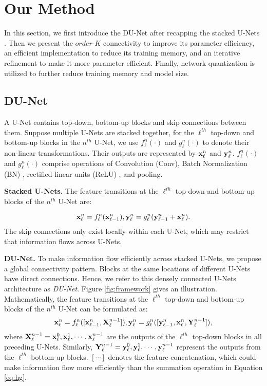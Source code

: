 \documentclass[runningheads]{llncs}
\begin{document}
%
 \section{Our Method}
In this section, we first introduce the DU-Net after recapping the stacked U-Nets \cite{newell2016stacked}. Then we present the $order$-$K$ connectivity to improve its parameter efficiency, an efficient implementation to reduce its training memory,
and an iterative refinement to make it more parameter efficient.
Finally, network quantization is utilized to further reduce training memory and model size.
\subsection{DU-Net}
A U-Net contains top-down, bottom-up blocks and skip connections between them. Suppose multiple U-Nets are stacked together, for the $\ell^{th}$ top-down and bottom-up blocks in the $n^{th}$ U-Net, we use $f_\ell^n(\cdot)$ and $g_\ell^n(\cdot)$ to denote their non-linear transformations. Their outputs are represented by ${\bf x}_\ell^n$ and ${\bf y}_\ell^n$. $f_\ell^n(\cdot)$ and $g_\ell^n(\cdot)$ comprise operations of Convolution (Conv), Batch Normalization (BN) \cite{ioffe2015batch}, rectified linear units (ReLU) \cite{glorot2011deep}, and pooling.


{\bf Stacked U-Nets.} The feature transitions at the $\ell^{th}$ top-down and bottom-up blocks of the $n^{th}$ U-Net are:

\begin{equation}\label{eq:hg}
    {\bf x}_\ell^n = f_\ell^n({\bf x}_{\ell-1}^n), {\bf y}_\ell^n = g_\ell^n({\bf y}_{\ell-1}^n+{\bf x}_\ell^n).
\end{equation}
The skip connections only exist locally within each U-Net, which may restrict that information flows across U-Nets.


{\bf DU-Net.} To make information flow efficiently across stacked U-Nets, we propose a global connectivity pattern. Blocks at the same locations of different U-Nets have direct connections. Hence, we refer to this densely connected U-Nets architecture as {\it DU-Net}. Figure \ref{fig:framework} gives an illustration. Mathematically, the feature transitions at the $\ell^{th}$ top-down and bottom-up blocks of the $n^{th}$ U-Net can be formulated as:
\begin{equation}\label{eq:dense-inputs}
    {\bf x}_\ell^n = f_\ell^n([{\bf x}_{\ell-1}^n, {\bf X}_\ell^{n-1}]), {\bf y}_\ell^n = g_\ell^n([{\bf y}_{\ell-1}^n,{\bf x}_\ell^n,{\bf Y}_\ell^{n-1}]),
\end{equation}
where ${\bf X}_\ell^{n-1}={\bf x}_\ell^0,{\bf x}_\ell^1,\cdots,{\bf x}_\ell^{n-1}$ are the outputs of the $\ell^{th}$ top-down blocks in all preceding U-Nets. Similarly, ${\bf Y}_\ell^{n-1}={\bf y}_\ell^0,{\bf y}_\ell^1,\cdots,{\bf y}_\ell^{n-1}$ represent the outputs from the $\ell^{th}$ bottom-up blocks. $[\cdots]$ denotes the feature concatenation, which could make information flow more efficiently than the summation operation in Equation \ref{eq:hg}. 
\end{document}
